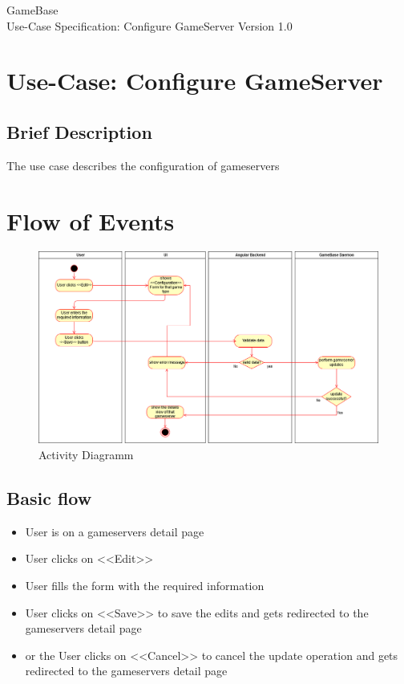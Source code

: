 \documentclass[a4paper,12pt,chapterprefix=false,bibliography=totoc,listof=totoc,]{scrreprt}
\begin{document}
\begin{flushright}
GameBase
\\
Use-Case Specification: Configure GameServer
\bigbreak
Version 1.0
\end{flushright}

\tableofcontents

\chapter{Use-Case: Configure GameServer}

\section{Brief Description}
The use case describes the configuration of gameservers

\chapter{Flow of Events}
\begin{figure}[H]
	\includegraphics[width=\textwidth]{diagramms/ConfigureGameserverActivityDiagramm.png}
	\caption{Activity Diagramm}
	\label{fig:ad}
\end{figure}

\section{Basic flow}

\begin{itemize}
    \item User is on a gameservers detail page
    \item User clicks on <<Edit>>
    \item User fills the form with the required information
    \item User clicks on <<Save>> to save the edits and gets redirected to the gameservers detail page
    \item or the User clicks on <<Cancel>> to cancel the update operation and gets redirected to the gameservers detail page
\end{itemize}
\end{document}

